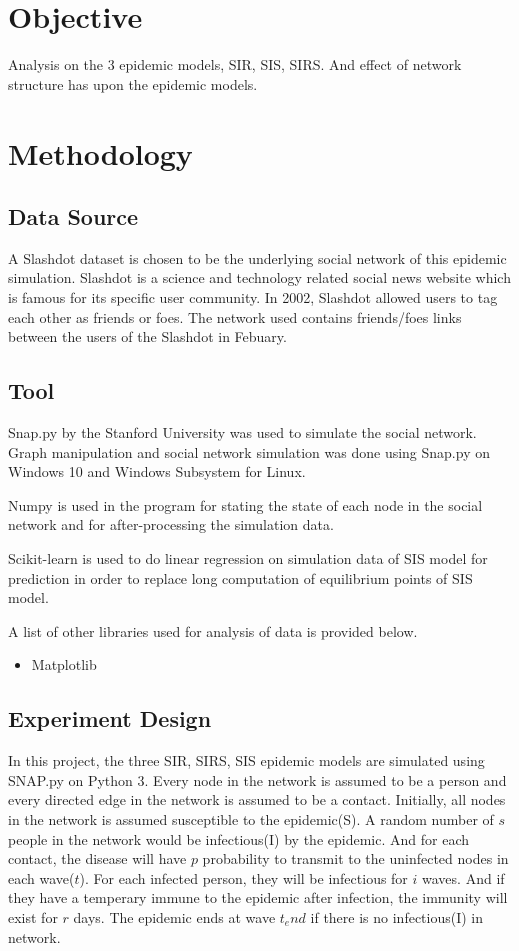 \documentclass{subfiles}
\begin{document}
  \section{Objective}
  Analysis on the 3 epidemic models, SIR, SIS, SIRS. And effect of network structure has upon the epidemic models.
  \section{Methodology}
  \subsection{Data Source}
  A Slashdot dataset is chosen to be the underlying social network of this epidemic simulation. Slashdot is a science and technology related social news website which is famous for its specific user community. In 2002, Slashdot allowed users to tag each other as friends or foes. The network used contains friends/foes links between the users of the Slashdot in Febuary\cite{leskovec2008community}.

  \subsection{Tool}
  Snap.py by the Stanford University was used to simulate the social network. Graph manipulation and social network simulation was done using Snap.py on Windows 10 and Windows Subsystem for Linux\cite{leskovec2016snap}.

  Numpy is used in the program for stating the state of each node in the social network and for after-processing the simulation data\cite{2020SciPy-NMeth}.

  Scikit-learn is used to do linear regression on simulation data of SIS model for prediction in order to replace long computation of equilibrium points of SIS model\cite{scikit-learn}.

  A list of other libraries used for analysis of data is provided below\cite{snapnets}.
  \begin{itemize}
    \item Matplotlib \cite{Hunter:2007}
  \end{itemize}

  \subsection{Experiment Design}
  In this project, the three SIR, SIRS, SIS epidemic models are simulated using SNAP.py on Python 3. Every node in the network is assumed to be a person and every directed edge in the network is assumed to be a contact. Initially, all nodes in the network is assumed susceptible to the epidemic(S). A random number of \(s\) people in the network would be infectious(I) by the epidemic. And for each contact, the disease will have \(p\) probability to transmit to the uninfected nodes in each wave(\(t\)). For each infected person, they will be infectious for \(i\) waves. And if they have a temperary immune to the epidemic after infection, the immunity will exist for \(r\) days. The epidemic ends at wave \(t_end\) if there is no infectious(I) in network.
\end{document}
